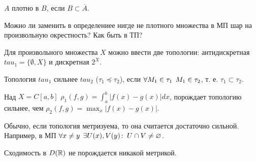 \documentclass[main]{subfiles}
\begin{document}
\begin{definition}
  \( A \) плотно в \( B \), если \( B \subset \overline{A} \).
\end{definition}

\begin{exercise}
  Можно ли заменить в определениее нигде не плотного множества в МП
  шар на произвольную окрестность? Как быть в ТП?
\end{exercise}

\begin{example}
  Для произвольного множества \( X \) можно ввести две
  топологии: антидискретная \( tau_1 = \{ \emptyset, X \} \)
  и дискретная \( 2^X \).
\end{example}

\begin{definition}
  Топология \( tau_1 \) сильнее \( tau_2 \)
  (\( \tau_1 \preceq \tau_2 \)),
  если \( \forall {M_1 \in \tau_1} \; \, M_1 \in \tau_2 \),
  т. е. \( \tau_1 \subset \tau_2 \).
\end{definition}

\begin{example}
  Над \( X = C[a, b] \) \( \rho_1(f, g) = \int_a^b |f(x) - g(x)| dx \),
  порождает топологию сильнее, чем
  \( \rho_2(f, g) = \max_x |f(x) - g(x)| \).
\end{example}

\begin{remark}
  Обычно, если топология метризуема,
  то она считается достаточно сильной.
  Например, в МП \( \forall {x \ne y} \; \,
  \exists U(x), V(y) \colon \: U \cap V \ne \varnothing \).
\end{remark}

\begin{exercise} %
  Сходимость в \( D(\mathbb{R}) \) не порождается никакой метрикой.
\end{exercise}

\begin{definition}
\end{definition}
\end{document}
